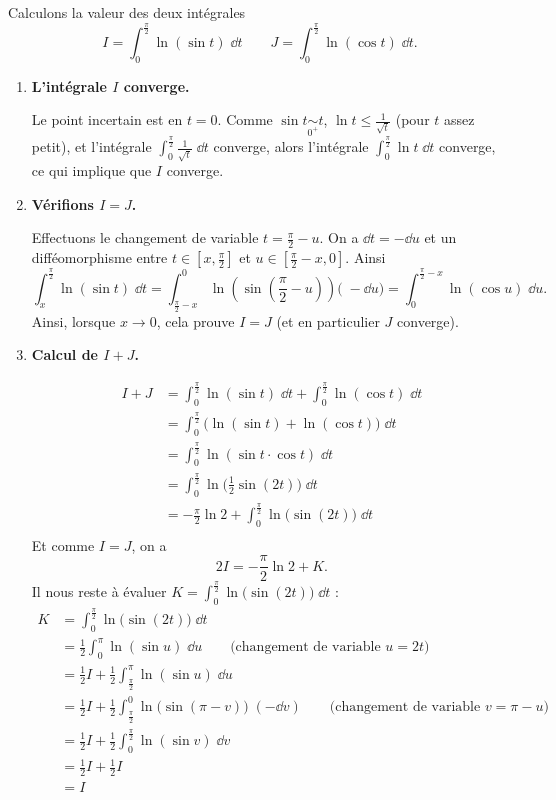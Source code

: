 \documentclass[class=report,crop=false]{standalone}
\begin{document}
\begin{exemple}
Calculons la valeur des deux intégrales 
$$I = \int_0^{\frac\pi2} \ln(\sin t) \;\dd t \qquad J = \int_0^{\frac\pi2} \ln(\cos t) \;\dd t.$$

\begin{enumerate}
  \item \textbf{L'intégrale $I$ converge.}
  
  Le point incertain est en $t=0$. Comme $\sin t \underset{0^+}{\sim} t$,
  $\ln t \le \frac{1}{\sqrt t}$ (pour $t$ assez petit), et l'intégrale 
  $\int_0^{\frac\pi2} \frac{1}{\sqrt t} \;\dd t$ converge,
  alors l'intégrale $\int_0^{\frac\pi2} \ln t \;\dd t$ converge, 
  ce qui implique que $I$ converge.
  
  \item \textbf{Vérifions $I=J$.}
  
  Effectuons le changement de variable $t=\frac\pi2 - u$. On a $\dd t = - \dd u$
  et un difféomorphisme entre $t\in[x,\frac\pi2]$ et $u\in[\frac\pi2-x,0]$.
  Ainsi
  $$\int_x^{\frac\pi2} \ln(\sin t) \;\dd t
  = \int_{\frac\pi2-x}^0 \ln\left(\sin \left(\frac\pi2 - u\right)\right) \big(\;-\dd u\big)
  = \int_0^{\frac\pi2-x} \ln(\cos u) \;\dd u.$$
  Ainsi, lorsque $x\to 0$, cela prouve $I=J$ (et en particulier $J$ converge).
  
  \item \textbf{Calcul de $I+J$.}
  
  \begin{align*}
  I+J  
  & = \int_0^{\frac\pi2} \ln(\sin t) \;\dd t + \int_0^{\frac\pi2} \ln(\cos t) \;\dd t \\
  & = \int_0^{\frac\pi2} \big(\ln(\sin t)  + \ln(\cos t)\big) \;\dd t \\
  & = \int_0^{\frac\pi2} \ln(\sin t \cdot \cos t) \;\dd t \\
  & = \int_0^{\frac\pi2} \ln\big(\tfrac12 \sin(2t)\big) \;\dd t \\
  & =  -\frac\pi2\ln 2 + \int_0^{\frac\pi2}\ln\big(\sin(2t)\big) \;\dd t \\
  \end{align*}
  Et comme $I=J$, on a 
  $$2I = -\frac\pi2\ln 2 + K.$$
    Il nous reste à évaluer $K = \int_0^{\frac\pi2} \ln\big(\sin(2t)\big) \;\dd t$ :
  \begin{align*}
  K 
  & = \int_0^{\frac\pi2} \ln\big(\sin(2t)\big) \;\dd t \\
  & = \frac12 \int_0^{\pi} \ln(\sin u) \;\dd u \qquad \text{(changement de variable $u = 2t$)} \\
  & = \frac12 I  + \frac12 \int_{\frac\pi2}^\pi \ln(\sin u) \;\dd u \\
  & = \frac12 I  + \frac12 \int_{\frac\pi2}^0 \ln\big(\sin (\pi-v)\big) \; (- \dd v)
      \qquad \text{(changement de variable $v = \pi - u$)} \\
  & = \frac12 I  + \frac12 \int_0^{\frac\pi2} \ln(\sin v) \; \dd v \\
  & = \frac12 I +\frac 12 I \\
  & = I \\
  \end{align*}
  

\end{enumerate}
\end{exemple}
\end{document}
